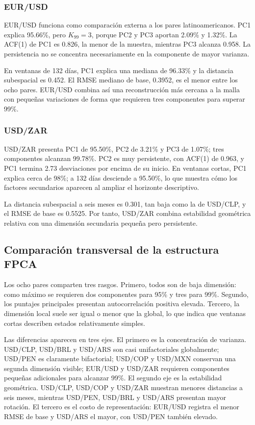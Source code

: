 \documentclass[a4paper,11pt]{article}
\begin{document}
\subsubsection{EUR/USD}

EUR/USD funciona como comparación externa a los pares latinoamericanos. PC1 explica 95.66\%, pero \(K_{99}=3\), porque PC2 y PC3 aportan 2.09\% y 1.32\%. La ACF(1) de PC1 es 0.826, la menor de la muestra, mientras PC3 alcanza 0.958. La persistencia no se concentra necesariamente en la componente de mayor varianza.

En ventanas de 132 días, PC1 explica una mediana de 96.33\% y la distancia subespacial es 0.452. El RMSE mediano de base, 0.3952, es el menor entre los ocho pares. EUR/USD combina así una reconstrucción más cercana a la malla con pequeñas variaciones de forma que requieren tres componentes para superar 99\%.

\subsubsection{USD/ZAR}

USD/ZAR presenta PC1 de 95.50\%, PC2 de 3.21\% y PC3 de 1.07\%; tres componentes alcanzan 99.78\%. PC2 es muy persistente, con ACF(1) de 0.963, y PC1 termina 2.73 desviaciones por encima de su inicio. En ventanas cortas, PC1 explica cerca de 98\%; a 132 días desciende a 95.50\%, lo que muestra cómo los factores secundarios aparecen al ampliar el horizonte descriptivo.

La distancia subespacial a seis meses es 0.301, tan baja como la de USD/CLP, y el RMSE de base es 0.5525. Por tanto, USD/ZAR combina estabilidad geométrica relativa con una dimensión secundaria pequeña pero persistente.

\subsection{Comparación transversal de la estructura FPCA}

Los ocho pares comparten tres rasgos. Primero, todos son de baja dimensión: como máximo se requieren dos componentes para 95\% y tres para 99\%. Segundo, los puntajes principales presentan autocorrelación positiva elevada. Tercero, la dimensión local suele ser igual o menor que la global, lo que indica que ventanas cortas describen estados relativamente simples.

Las diferencias aparecen en tres ejes. El primero es la concentración de varianza. USD/CLP, USD/BRL y USD/ARS son casi unifactoriales globalmente; USD/PEN es claramente bifactorial; USD/COP y USD/MXN conservan una segunda dimensión visible; EUR/USD y USD/ZAR requieren componentes pequeñas adicionales para alcanzar 99\%. El segundo eje es la estabilidad geométrica. USD/CLP, USD/COP y USD/ZAR muestran menores distancias a seis meses, mientras USD/PEN, USD/BRL y USD/ARS presentan mayor rotación. El tercero es el costo de representación: EUR/USD registra el menor RMSE de base y USD/ARS el mayor, con USD/PEN también elevado.
\end{document}
